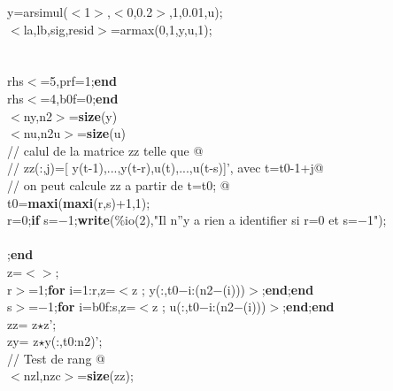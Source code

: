 {\begin{flushleft}
{\cmarg \hspace{2.0cm}y=arsimul($<$1$>$,$<$0,0.2$>$,1,0.01,u);\\ 
\cmarg \hspace{2.0cm}$<$la,lb,sig,resid$>$=armax(0,1,y,u,1);\\ 
\cmarg \hspace{2.0cm}{\bf return}\\ 
 \\ 
 rhs$<$=5,prf=1;{\bf end}\\ 
 rhs$<$=4,b0f=0;{\bf end}\\ 
\cmarg $<$ny,n2$>$={\bf size}(y)\\ 
\cmarg $<$nu,n2u$>$={\bf size}(u)\\ 
\cmarg \verb@// calul de la matrice zz telle que @\\ 
\cmarg \verb@// zz(:,j)=[ y(t-1),...,y(t-r),u(t),...,u(t-s)]', avec  t=t0-1+j@\\ 
\cmarg \verb@// on peut calcule zz a partir de t=t0; @\\ 
\cmarg \hspace{0.2cm}t0={\bf maxi}({\bf maxi}(r,s)+1,1);\\ 
\cmarg \hspace{0.2cm}{\bf if} r=0;{\bf if} s=$-$1;{\bf write}(\%io(2),"Il n''y a rien a identifier si r=0 et s=$-$1");\\ 
\cmarg \hspace{0.2cm}{\bf return}\\ 
\cmarg \hspace{0.2cm}{\bf end};{\bf end}\\ 
\cmarg \hspace{0.2cm}z=$<$$>$;\\ 
\cmarg \hspace{0.2cm}{\bf if} r$>$=1;{\bf for} i=1:r,z=$<$z ; y(:,t0$-$i:(n2$-$(i)))$>$;{\bf end};{\bf end}\\ 
\cmarg \hspace{0.2cm}{\bf if} s$>$=$-$1;{\bf for} i=b0f:s,z=$<$z ; u(:,t0$-$i:(n2$-$(i)))$>$;{\bf end};{\bf end}\\ 
\cmarg \hspace{0.2cm}zz= z$\star$z';\\ 
\cmarg \hspace{0.2cm}zy= z$\star$y(:,t0:n2)';\\ 
\cmarg \verb@// Test de rang @\\ 
\cmarg \hspace{0.2cm}$<$nzl,nzc$>$={\bf size}(zz);\\ 
$$}
\end{flushleft}}
